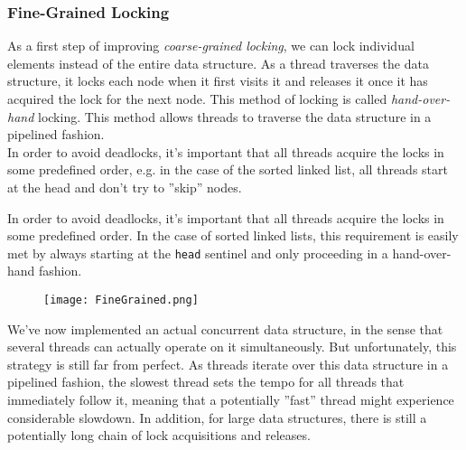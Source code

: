 \documentclass[main]{subfiles}
\begin{document}

\subsubsection{Fine-Grained Locking}
As a first step of improving \textit{coarse-grained locking}, we can lock individual elements instead of the entire data structure. As a thread traverses the data structure, it locks each node when it first visits it and releases it once it has acquired the lock for the next node. This method of locking is called \textit{hand-over-hand} locking. This method allows threads to traverse the data structure in a pipelined fashion.\\[3mm]
In order to avoid deadlocks, it's important that all threads acquire the locks in some predefined order, e.g. in the case of the sorted linked list, all threads start at the head and don't try to ''skip'' nodes. 
\begin{example}
    In order to avoid deadlocks, it's important that all threads acquire the locks in some predefined order. In the case of sorted linked lists, this requirement is easily met by always starting at the \texttt{head} sentinel and only proceeding in a hand-over-hand fashion.
    \begin{figure}[H]
        \centering
        \texttt{[image: FineGrained.png]}
    \end{figure}
\end{example}
We've now implemented an actual concurrent data structure, in the sense that several threads can actually operate on it simultaneously. But unfortunately, this strategy is still far from perfect. As threads iterate over this data structure in a pipelined fashion, the slowest thread sets the tempo for all threads that immediately follow it, meaning that a potentially ''fast'' thread might experience considerable slowdown. In addition, for large data structures, there is still a potentially long chain of lock acquisitions and releases.

\end{document}
